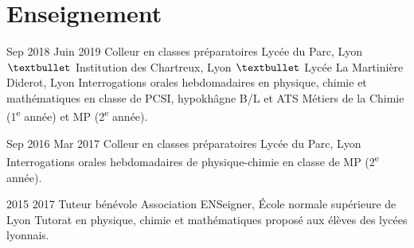 \documentclass[letterpaper]{cvtemplate_fr} %
\begin{document}
\section{Enseignement}
\begin{cvbody}

\cvitem
	{Sep 2018}
	{Juin 2019}
	{Colleur en classes pr\'eparatoires}
	{Lyc\'ee du Parc, Lyon $\textbullet$ Institution des Chartreux, Lyon $\textbullet$ Lyc\'ee La Martinière Diderot, Lyon }
	{}{}{}
	{}
	{Interrogations orales hebdomadaires en physique, chimie et math\'ematiques en classe de PCSI, hypokh\^agne B/L et ATS M\'etiers de la Chimie (1\textsuperscript{e} ann\'ee) et MP (2\textsuperscript{e} ann\'ee).\\}

\cvitem
	{Sep 2016}
	{Mar 2017}
	{Colleur en classes pr\'eparatoires}
	{Lyc\'ee du Parc, Lyon }
	{}{}{}
	{}
	{Interrogations orales hebdomadaires de physique-chimie en classe de MP (2\textsuperscript{e} ann\'ee).\\}

\cvitem
	{2015}
	{2017}
	{Tuteur b\'en\'evole}
	{Association ENSeigner, \'Ecole normale sup\'erieure de Lyon }
	{}{}{}
	{}
	{Tutorat en physique, chimie et math\'ematiques propos\'e aux \'el\`eves des lyc\'ees lyonnais.}

\end{cvbody}
\end{document}
